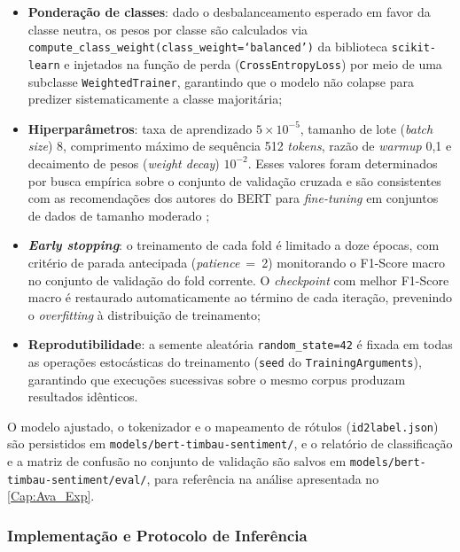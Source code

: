 \begin{itemize}
	\item \textbf{Ponderação de classes}: dado o desbalanceamento esperado em favor da classe neutra, os pesos por classe são calculados via \texttt{compute\_class\_weight(class\_weight=`balanced')} da biblioteca \texttt{scikit-learn} e injetados na função de perda (\texttt{CrossEntropyLoss}) por meio de uma subclasse \texttt{WeightedTrainer}, garantindo que o modelo não colapse para predizer sistematicamente a classe majoritária;
	
	\item \textbf{Hiperparâmetros}: taxa de aprendizado $5 \times 10^{-5}$, tamanho de lote (\textit{batch size}) 8, comprimento máximo de sequência 512 \textit{tokens}, razão de \textit{warmup} 0,1 e decaimento de pesos (\textit{weight decay}) $10^{-2}$. Esses valores foram determinados por busca empírica sobre o conjunto de validação cruzada e são consistentes com as recomendações dos autores do BERT para \textit{fine-tuning} em conjuntos de dados de tamanho moderado \cite{devlin2019};
	
	\item \textbf{\textit{Early stopping}}: o treinamento de cada fold é limitado a doze épocas, com critério de parada antecipada (\textit{patience}~=~2) monitorando o F1-Score macro no conjunto de validação do fold corrente. O \textit{checkpoint} com melhor F1-Score macro é restaurado automaticamente ao término de cada iteração, prevenindo o \textit{overfitting} à distribuição de treinamento;
	
	\item \textbf{Reprodutibilidade}: a semente aleatória \texttt{random\_state=42} é fixada em todas as operações estocásticas do treinamento (\texttt{seed} do \texttt{TrainingArguments}), garantindo que execuções sucessivas sobre o mesmo corpus produzam resultados idênticos.
\end{itemize}

O modelo ajustado, o tokenizador e o mapeamento de rótulos (\texttt{id2label.json}) são persistidos em \texttt{models/bert-timbau-sentiment/}, e o relatório de classificação e a matriz de confusão no conjunto de validação são salvos em \texttt{models/bert-timbau-sentiment/eval/}, para referência na análise apresentada no \autoref{Cap:Ava_Exp}.

\subsubsection{Implementação e Protocolo de Inferência}
\label{subsubsec:protocolo_inferencia_bertimbau}

